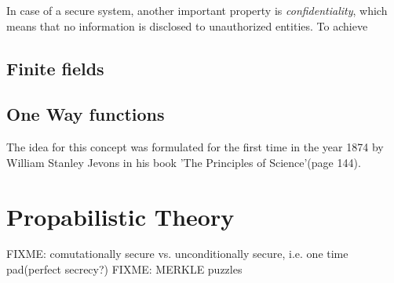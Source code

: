 In case of a secure system, another important property is \textit{confidentiality}, which means that no information is disclosed to unauthorized 
entities.
To achieve 

\subsection{Finite fields}

\subsection{One Way functions}

The idea for this concept was formulated for the first time in the year 1874 by William Stanley Jevons in his book
'The Principles of Science'(page 144).

\section{Propabilistic Theory}



FIXME: comutationally secure vs. unconditionally secure, i.e. one time pad(perfect secrecy?)
FIXME: MERKLE puzzles

